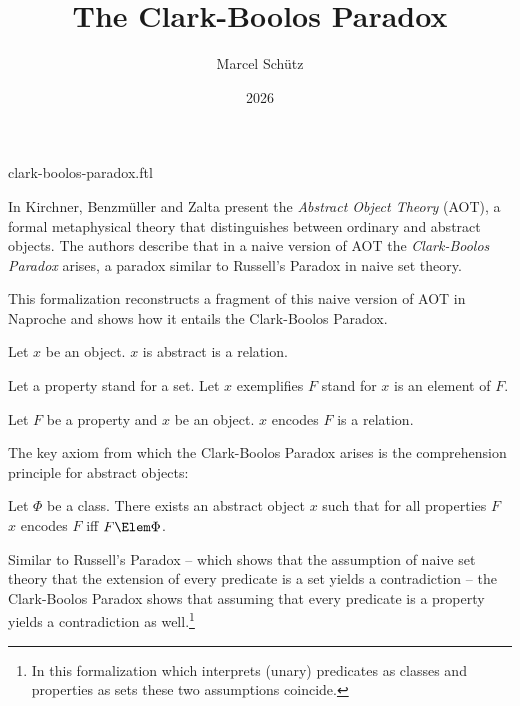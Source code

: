 \documentclass{stex}
\title{The Clark-Boolos Paradox}
\author{Marcel Schütz}
\date{2026}
\begin{document}
\begin{smodule}{clark-boolos-paradox.ftl}



\maketitle

\noindent
In \cite{KirchnerBenzmuellerZalta2019} Kirchner, Benzmüller and Zalta present
the \emph{Abstract Object Theory} (AOT), a formal metaphysical
theory that distinguishes between ordinary and abstract
objects.
The authors describe that in a naive version of AOT the \emph{Clark-Boolos
Paradox} arises, a paradox similar to Russell's Paradox in naive set theory.

This formalization reconstructs a fragment of this naive version of AOT in
Naproche and shows how it entails the Clark-Boolos Paradox.

\begin{forthel}
  \begin{signature*}
    Let $x$ be an object.
    $x$ is abstract is a relation.
  \end{signature*}

  Let a property stand for a set.
  Let $x$ exemplifies $F$ stand for $x$ is an element of $F$.

  \begin{signature*}
    Let $F$ be a property and $x$ be an object.
    $x$ encodes $F$ is a relation.
  \end{signature*}
\end{forthel}

The key axiom from which the Clark-Boolos Paradox arises
is the comprehension principle for abstract objects:

\begin{forthel}
  \begin{axiom*}[title=Comprehension Principle,name=Comprehension Principle]
    Let $\Phi$ be a class.
    There exists an abstract object $x$ such that for all properties $F$ $x$ encodes $F$ iff $F \Elem \Phi$.
  \end{axiom*}
\end{forthel}

Similar to Russell's Paradox -- which shows that the
assumption of naive set theory that the extension of
every predicate is a set yields a contradiction -- the
Clark-Boolos Paradox shows that assuming that every
predicate is a property yields a contradiction as
well.\footnote{%
  In this formalization which interprets (unary) predicates
  as classes and properties as sets these two assumptions
  coincide.
}


\end{smodule}
\end{document}
